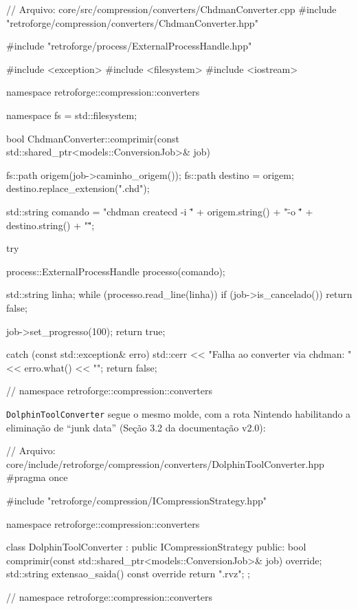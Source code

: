 \begin{CaixaCodigo}
// Arquivo: core/src/compression/converters/ChdmanConverter.cpp
#include "retroforge/compression/converters/ChdmanConverter.hpp"

#include "retroforge/process/ExternalProcessHandle.hpp"

#include <exception>
#include <filesystem>
#include <iostream>

namespace retroforge::compression::converters {

namespace fs = std::filesystem;

bool ChdmanConverter::comprimir(const std::shared_ptr<models::ConversionJob>& job) {
    fs::path origem(job->caminho_origem());
    fs::path destino = origem;
    destino.replace_extension(".chd");

    std::string comando =
        "chdman createcd -i \"" + origem.string() + "\" -o \"" + destino.string() + "\"";

    try {
        process::ExternalProcessHandle processo(comando);

        std::string linha;
        while (processo.read_line(linha)) {
            if (job->is_cancelado()) {
                return false;
            }
        }

        job->set_progresso(100);
        return true;

    } catch (const std::exception& erro) {
        std::cerr << "Falha ao converter via chdman: " << erro.what() << "\n";
        return false;
    }
}

} // namespace retroforge::compression::converters
\end{CaixaCodigo}

\texttt{DolphinToolConverter} segue o mesmo molde, com a rota Nintendo habilitando a eliminação de ``junk data'' (Seção 3.2 da documentação v2.0):

\begin{CaixaCodigo}
// Arquivo: core/include/retroforge/compression/converters/DolphinToolConverter.hpp
#pragma once

#include "retroforge/compression/ICompressionStrategy.hpp"

namespace retroforge::compression::converters {

class DolphinToolConverter : public ICompressionStrategy {
public:
    bool comprimir(const std::shared_ptr<models::ConversionJob>& job) override;
    std::string extensao_saida() const override { return ".rvz"; }
};

} // namespace retroforge::compression::converters
\end{CaixaCodigo}

